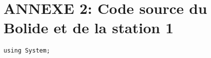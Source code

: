 \section{ANNEXE 2: Code source du Bolide et de la station 1}
\begin{lstlisting}
using System;
\end{lstlisting}
